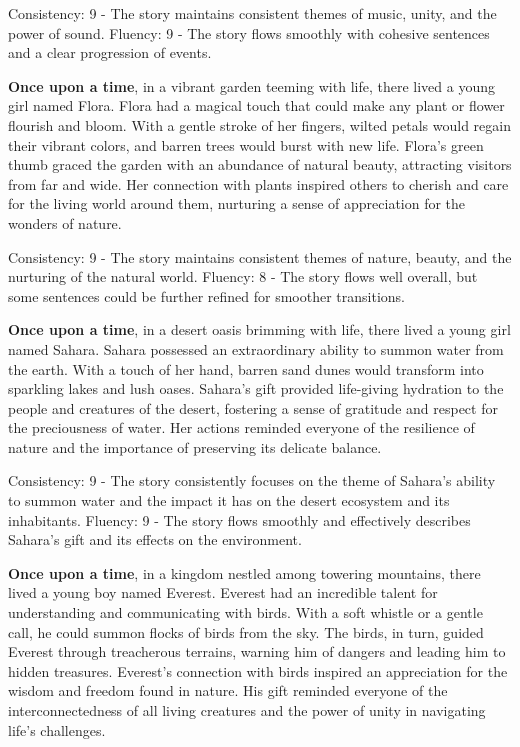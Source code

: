 \documentclass{article}
\begin{document}
Consistency: 9 - The story maintains consistent themes of music, unity, and the power of sound.
Fluency: 9 - The story flows smoothly with cohesive sentences and a clear progression of events.

\textbf{Once upon a time}, in a vibrant garden teeming with life, there lived a young girl named Flora. Flora had a magical touch that could make any plant or flower flourish and bloom. With a gentle stroke of her fingers, wilted petals would regain their vibrant colors, and barren trees would burst with new life. Flora's green thumb graced the garden with an abundance of natural beauty, attracting visitors from far and wide. Her connection with plants inspired others to cherish and care for the living world around them, nurturing a sense of appreciation for the wonders of nature.

Consistency: 9 - The story maintains consistent themes of nature, beauty, and the nurturing of the natural world.
Fluency: 8 - The story flows well overall, but some sentences could be further refined for smoother transitions.

\textbf{Once upon a time}, in a desert oasis brimming with life, there lived a young girl named Sahara. Sahara possessed an extraordinary ability to summon water from the earth. With a touch of her hand, barren sand dunes would transform into sparkling lakes and lush oases. Sahara's gift provided life-giving hydration to the people and creatures of the desert, fostering a sense of gratitude and respect for the preciousness of water. Her actions reminded everyone of the resilience of nature and the importance of preserving its delicate balance.

Consistency: 9 - The story consistently focuses on the theme of Sahara's ability to summon water and the impact it has on the desert ecosystem and its inhabitants.
Fluency: 9 - The story flows smoothly and effectively describes Sahara's gift and its effects on the environment.

\textbf{Once upon a time}, in a kingdom nestled among towering mountains, there lived a young boy named Everest. Everest had an incredible talent for understanding and communicating with birds. With a soft whistle or a gentle call, he could summon flocks of birds from the sky. The birds, in turn, guided Everest through treacherous terrains, warning him of dangers and leading him to hidden treasures. Everest's connection with birds inspired an appreciation for the wisdom and freedom found in nature. His gift reminded everyone of the interconnectedness of all living creatures and the power of unity in navigating life's challenges.
\end{document}
